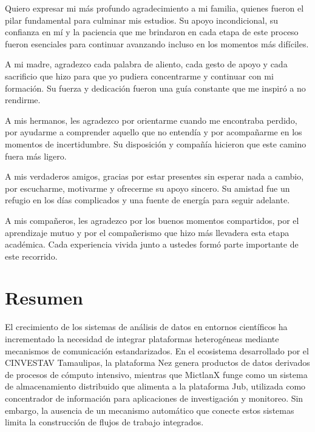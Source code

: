 \documentclass[12pt]{article}
\begin{document}
Quiero expresar mi m\'as profundo agradecimiento a mi familia, quienes fueron el pilar fundamental para culminar mis estudios. Su apoyo incondicional, su confianza en m\'i y la paciencia que me brindaron en cada etapa de este proceso fueron esenciales para continuar avanzando incluso en los momentos m\'as dif\'iciles.

A mi madre, agradezco cada palabra de aliento, cada gesto de apoyo y cada sacrificio que hizo para que yo pudiera concentrarme y continuar con mi formaci\'on. Su fuerza y dedicaci\'on fueron una gu\'ia constante que me inspir\'o a no rendirme.

A mis hermanos, les agradezco por orientarme cuando me encontraba perdido, por ayudarme a comprender aquello que no entend\'ia y por acompa\~narme en los momentos de incertidumbre. Su disposici\'on y compa\~n\'ia hicieron que este camino fuera m\'as ligero.

A mis verdaderos amigos, gracias por estar presentes sin esperar nada a cambio, por escucharme, motivarme y ofrecerme su apoyo sincero. Su amistad fue un refugio en los d\'ias complicados y una fuente de energ\'ia para seguir adelante.

A mis compa\~neros, les agradezco por los buenos momentos compartidos, por el aprendizaje mutuo y por el compa\~nerismo que hizo m\'as llevadera esta etapa acad\'emica. Cada experiencia vivida junto a ustedes form\'o parte importante de este recorrido.



\clearpage
\section*{\centering Resumen}
%
El crecimiento de los sistemas de an\'alisis de datos en entornos cient\'ificos ha incrementado la necesidad de integrar plataformas heterog\'eneas mediante mecanismos de comunicaci\'on estandarizados. En el ecosistema desarrollado por el CINVESTAV Tamaulipas, la plataforma Nez genera productos de datos derivados de procesos de c\'omputo intensivo, mientras que MictlanX funge como un sistema de almacenamiento distribuido que alimenta a la plataforma Jub, utilizada como concentrador de informaci\'on para aplicaciones de investigaci\'on y monitoreo. Sin embargo, la ausencia de un mecanismo autom\'atico que conecte estos sistemas limita la construcci\'on de flujos de trabajo integrados.
\end{document}
